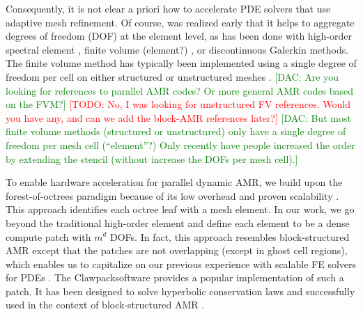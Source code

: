 \documentclass{IOS-Book-Article}     %
\newcommand{\comment}[1]{\textcolor{green}{[DAC: #1]}\xspace}
\newcommand{\todo}[1]{\textcolor{red}{[TODO: #1]}\xspace}
\newcommand{\clawpack}{{\sc Clawpack\xspace}}
\begin{document}
Consequently, it is not clear a priori how to accelerate PDE solvers
that use adaptive mesh refinement.
Of course, was realized early that it helps to aggregate degrees of
freedom (DOF) at the element level, as has been done with high-order
spectral element \cite{TufoFischer99}, finite volume (element?)
\cite{???}, or discontinuous Galerkin
\cite{BursteddeGhattasGurnisEtAl10} methods.  The finite volume method
has typically been implemented using a single degree of freedom per
cell on either structured \cite{ppm, clawpack, weno} or unstructured
meshes \cite{ddfv, ausm+, openfoam, }.  \comment{Are you looking for
  references to parallel AMR codes?  Or more general AMR codes based
  on the FVM?}  \todo{No, I was looking for unstructured FV
  references.  Would you have any, and can we add the block-AMR
  references later?} \comment{But most finite volume methods
  (structured or unstructured) only have a single degree of freedom
  per mesh cell (``element''?)  Only recently have people increased
  the order by extending the stencil (without increase the DOFs per
  mesh cell).}


To enable hardware acceleration for parallel dynamic AMR, we
build upon the forest-of-octrees paradigm because of its low overhead
and proven scalability \cite{BursteddeWilcoxGhattas11}.  This approach
identifies each octree leaf with a mesh element.  In our work, we go
beyond the traditional high-order element and define each element to
be a dense compute patch with $m^d$ DOFs.  In fact, this approach
resembles block-structured AMR \cite{be-ol:1984, be-co:1989, be-le:1991,
ColellaGravesKeenEtAl07,
BerzinsLuitjensMengEtAl10} except that the
patches are not overlapping (except in ghost cell regions),
which enables us to capitalize on our
previous experience with scalable FE solvers for PDEs
\cite{BursteddeStadlerAlisicEtAl13}.  The \clawpack software
\cite{LeVeque97} provides a popular implementation of such a patch.
It has been designed to solve hyperbolic conservation laws
and successfully used in the context of block-structured AMR
\cite{be-le:1991, amrclaw}.
\end{document}
